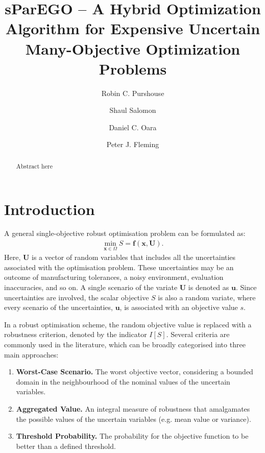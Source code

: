 \documentclass[10pt]{llncs}
\newcommand{\brr}[1]{{\left({#1}\right)}} %
\newcommand{\I}[1]{I\!\left[{#1}\right]} %
\newcommand{\vx}{\mathbf{x}} %
\newcommand{\vf}{\mathbf{f}} %
\newcommand{\vu}{\mathbf{u}} %
\newcommand{\vU}{\mathbf{U}} %
\begin{document}
\title{sParEGO -- A Hybrid Optimization Algorithm for Expensive Uncertain Many-Objective Optimization Problems}
\author{Robin C. Purshouse \and Shaul Salomon \and Daniel C. Oara \and Peter J. Fleming}

\maketitle

\begin{abstract}
Abstract here
\end{abstract}

\section{Introduction}
A general single-objective robust optimisation problem can be formulated as:
\begin{align}
\label{eq:rev:robust}
\min_{\vx\in\Omega} S=\vf\brr{\vx,\vU}.
\end{align}
Here, $\vU$ is a vector of random variables that includes all the uncertainties associated with the optimisation problem.
These uncertainties may be an outcome of manufacturing tolerances, a noisy environment, evaluation inaccuracies, and so on.
A single scenario of the variate $\vU$ is denoted as $\vu$.
Since uncertainties are involved, the scalar objective $S$ is also a random variate, where every scenario of the uncertainties, $\vu$, is associated with an objective value $s$.

In a robust optimisation scheme, the random objective value is replaced with a robustness criterion, denoted by the indicator $\I{S}$.
Several criteria are commonly used in the literature, which can be broadly categorised into three main approaches:
\begin{enumerate}
%
\item \textbf{Worst-Case Scenario.} The worst objective vector, considering a bounded domain in the neighbourhood of the nominal values of the uncertain variables.
%
\item \textbf{Aggregated Value.} An integral measure of robustness that amalgamates the possible values of the uncertain variables (e.g. mean value or variance).
%
\item \textbf{Threshold Probability.} The probability for the objective function to be better than a defined threshold.
\end{enumerate}
\end{document}

